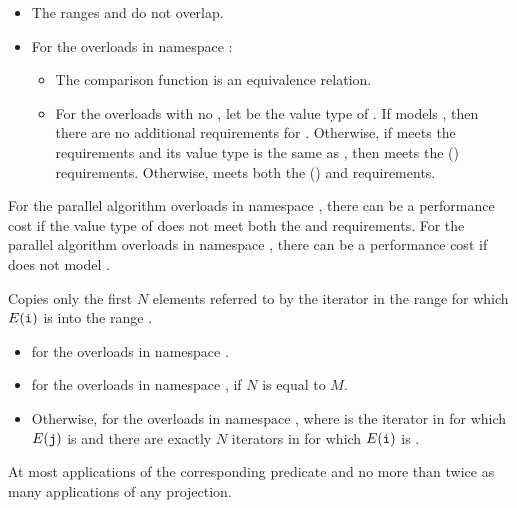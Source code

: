 \begin{itemdescr}
\pnum
\expects
\begin{itemize}
\item
  The ranges  and 
  do not overlap.
\item
  For the overloads in namespace :
  \begin{itemize}
  \item
    The comparison function is an equivalence relation.
  \item
    For the overloads with no ,
    let  be the value type of .
    If  models
    ,
    then there are no additional requirements for .
    Otherwise, if  meets
    the  requirements and
    its value type is the same as ,
    then  meets
    the  () requirements.
    Otherwise,  meets both
    the  () and
     requirements.
  \end{itemize}
\end{itemize}
\begin{note}
For the parallel algorithm overloads in namespace ,
there can be a performance cost
if the value type of  does not meet both the
 and  requirements.
For the parallel algorithm overloads in namespace ,
there can be a performance cost if 
does not model .
\end{note}

\pnum
\effects
Copies only the first $N$ elements
referred to by the iterator  in the range 
for which $E(\tcode{i})$ is 
into the range .

\pnum
\returns
\begin{itemize}
\item
  for the overloads in namespace .
\item
  for the overloads in namespace ,
  if $N$ is equal to $M$.
\item
  Otherwise, 
  for the overloads in namespace ,
  where  is the iterator in 
  for which $E(\tcode{j})$ is 
  and there are exactly $N$ iterators  in 
  for which $E(\tcode{i})$ is .
\end{itemize}

\pnum
\complexity
At most  applications
of the corresponding predicate
and no more than twice as many applications of any projection.
\end{itemdescr}

